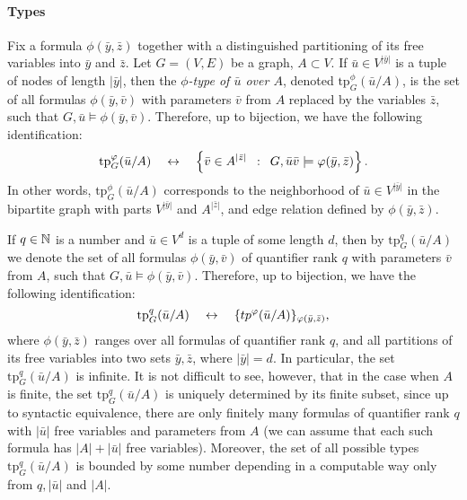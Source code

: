 \paragraph{Types}
\newcommand{\tp}{\mathrm{tp}}
Fix a formula $\phi(\bar y,\bar z)$ together with a distinguished partitioning of its free variables into $\bar y$ and $\bar z$.
Let $G=(V,E)$ be a graph, $A\subset V$.
If $\bar u\in V^{|\bar y|}$ is a tuple of 
nodes of length $|\bar y|$, then the 
\emph{$\phi$-type of $\bar u$ over $A$},
denoted $\tp^\phi_G(\bar u/A)$,
is the set of all
formulas  $\phi(\bar y,\bar v)$ 
with parameters $\bar v$ from $A$
replaced by the variables $\bar z$,
such that $G,\bar u\models \phi(\bar y,\bar v)$.
Therefore, up to  bijection, we have the following identification:
$$\tp^\phi_G(\bar u/A)\quad\leftrightarrow\quad\setof{\bar v\in  A^{|\bar z|}}{G, \bar u\bar v\models \phi(\bar y,\bar z)}.$$
In other words, $\tp^\phi_G(\bar u/A)$ corresponds to the
neighborhood of $\bar u\in V^{|\bar y|}$ in the bipartite graph with parts $V^{|\bar y|}$ and $A^{|\bar z|}$,
and edge relation defined by $\phi(\bar y,\bar z)$.


If $q\in \mathbb{N}$ is a number and $\bar u\in  V^{d}$
is a tuple of some length $d$, then by $\tp^q_G(\bar u/A)$  we denote the set of all formulas $\phi(\bar y,\bar v)$
of quantifier rank $q$ with parameters $\bar v$ from $A$,
such that $G,\bar u\models \phi(\bar y,\bar v)$.
Therefore, up to  bijection, we have the following identification:
$$\tp^q_G(\bar u/A)\quad\leftrightarrow\quad\set{tp^\phi(\bar u/A)}_{\phi(\bar y,\bar z)},$$
where $\phi(\bar y,\bar z)$ ranges over all formulas of quantifier rank $q$, and all partitions of its free variables into two sets $\bar y,\bar z$,
where $|\bar y|=d$. 
In particular, the set $\tp^q_G(\bar u/A)$ is infinite.
It is not difficult to see, however, that in the case when $A$ is finite,
the set $\tp^q_G(\bar u/A)$ is uniquely determined by its finite subset, since up to syntactic equivalence, there are only finitely many formulas of quantifier rank $q$ with $|\bar u|$ free variables and  parameters from $A$
(we can assume that each such formula has $|A|+|\bar u|$ free variables).
Moreover, the set of all possible types 
$\tp^q_G(\bar u/A)$ is bounded by some number 
depending in a computable way only from 
$q,|\bar u|$ and $|A|$.

